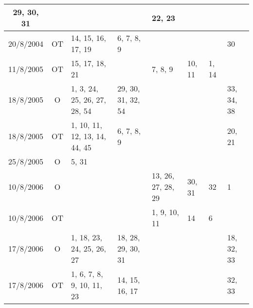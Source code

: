 \begin{longtable}{|c|c|p{1.85cm}|p{1.85cm}|p{1.85cm}|p{1.85cm}|p{1.85cm}|p{1.85cm}|}
	\raggedright 29, 30, 31 &
	\raggedright &
	\raggedright &
	\raggedright &
	\raggedright 22, 23
	\tabularnewline
\hline
	20/8/2004	&
	OT	&
	\raggedright 14, 15, 16, 17, 19 &
	\raggedright 6, 7, 8, 9 &
	\raggedright &
	\raggedright &
	\raggedright &
	\raggedright 30
	\tabularnewline
\hline
	11/8/2005	&
	OT	&
	\raggedright 15, 17, 18, 21 &
	\raggedright &
	\raggedright 7, 8, 9 &
	\raggedright 10, 11 &
	\raggedright 1, 14 &
	\raggedright 
	\tabularnewline
\hline
	18/8/2005	&
	O	&
	\raggedright 1, 3, 24, 25, 26, 27, 28, 54 &
	\raggedright 29, 30, 31, 32, 54 &
	\raggedright &
	\raggedright &
	\raggedright &
	\raggedright 33, 34, 38
	\tabularnewline
\hline
	18/8/2005	&
	OT	&
	\raggedright 1, 10, 11, 12, 13, 14, 44, 45 &
	\raggedright 6, 7, 8, 9 &
	\raggedright &
	\raggedright &
	\raggedright &
	\raggedright 20, 21
	\tabularnewline
\hline
	25/8/2005	&
	O	&
	\raggedright 5, 31 &
	\raggedright &
	\raggedright &
	\raggedright &
	\raggedright &
	\raggedright 
	\tabularnewline
\hline
	10/8/2006	&
	O	&
	\raggedright &
	\raggedright &
	\raggedright 13, 26, 27, 28, 29 &
	\raggedright 30, 31 &
	\raggedright 32 &
	\raggedright 1
	\tabularnewline
\hline
	10/8/2006	&
	OT	&
	\raggedright &
	\raggedright &
	\raggedright 1, 9, 10, 11 &
	\raggedright 14 &
	\raggedright 6 &
	\raggedright 
	\tabularnewline
\hline
	17/8/2006	&
	O	&
	\raggedright 1, 18, 23, 24, 25, 26, 27 &
	\raggedright 18, 28, 29, 30, 31 &
	\raggedright &
	\raggedright &
	\raggedright &
	\raggedright 18, 32, 33
	\tabularnewline
\hline
	17/8/2006	&
	OT	&
	\raggedright 1, 6, 7, 8, 9, 10, 11, 23 &
	\raggedright 14, 15, 16, 17 &
	\raggedright &
	\raggedright &
	\raggedright &
	\raggedright 32, 33
	\tabularnewline
\hline
\end{longtable}









